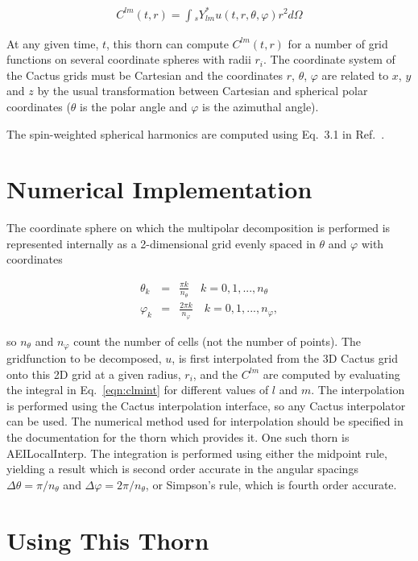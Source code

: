 \documentclass{article}
\begin{document}
\begin{eqnarray}
C^{lm}(t, r) = \int {}_s Y_{lm}^* u(t, r, \theta, \varphi) r^2 d \Omega \label{eqn:clmint}
\end{eqnarray}

At any given time, $t$, this thorn can compute $C^{lm}(t,r)$ for a
number of grid functions on several coordinate spheres with radii $r_i$.
The coordinate system of the Cactus grids must be Cartesian and the
coordinates $r$, $\theta$, $\varphi$ are related to $x$, $y$ and $z$
by the usual transformation between Cartesian and spherical polar
coordinates ($\theta$ is the polar angle and $\varphi$ is the
azimuthal angle).

The spin-weighted spherical harmonics are computed using Eq.~3.1 in
Ref.~\cite{Goldberg:1966uu}.

\section{Numerical Implementation}

The coordinate sphere on which the multipolar decomposition is
performed is represented internally as a 2-dimensional grid evenly
spaced in $\theta$ and $\varphi$ with coordinates

\begin{eqnarray}
\theta_k &=& \frac{\pi k}{n_\theta} \quad k = 0, 1, ..., n_\theta \\
\varphi_k &=& \frac{2\pi k}{n_\varphi} \quad k = 0, 1, ..., n_\varphi,
\end{eqnarray}

so $n_\theta$ and $n_\varphi$ count the number of cells (not the
number of points).  The gridfunction to be decomposed, $u$, is first
interpolated from the 3D Cactus grid onto this 2D grid at a given
radius, $r_i$, and the $C^{lm}$ are computed by evaluating the integral
in Eq.~\ref{eqn:clmint} for different values of $l$ and $m$.  The
interpolation is performed using the Cactus interpolation interface,
so any Cactus interpolator can be used.  The numerical method used for
interpolation should be specified in the documentation for the thorn
which provides it.  One such thorn is AEILocalInterp.  The integration
is performed using either the midpoint rule, yielding a result which
is second order accurate in the angular spacings $\Delta \theta =
\pi/n_\theta$ and $\Delta \varphi = 2\pi/n_\theta$, or Simpson's rule,
which is fourth order accurate.

\section{Using This Thorn}
\end{document}
